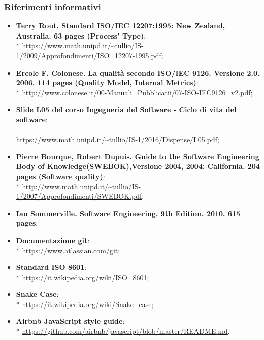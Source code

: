 \subsubsection{Riferimenti informativi}
\begin{itemize}
	\item \textbf{Terry Rout. Standard ISO/IEC 12207:1995: New Zealand, Australia. 63 pages (Process' Type)}:\\* 
	\url{https://www.math.unipd.it/~tullio/IS-1/2009/Approfondimenti/ISO_12207-1995.pdf};
	\item \textbf{Ercole F. Colonese. La qualità secondo ISO/IEC 9126. Versione 2.0. 2006. 114 pages (Quality Model, Internal Metrics)}: \\*
	\url{http://www.colonese.it/00-Manuali_Pubblicatii/07-ISO-IEC9126_v2.pdf};
	\item \textbf{Slide L05 del corso Ingegneria del Software - Ciclo di vita 
	del software}:\\ \\
		\url{https://www.math.unipd.it/~tullio/IS-1/2016/Dispense/L05.pdf};
	\item \textbf{Pierre Bourque, Robert Dupuis. Guide to the Software Engineering Body of Knowledge(SWEBOK),Versione 2004, 2004: California. 204 pages (Software quality)}: \\*
		\url{http://www.math.unipd.it/~tullio/IS-1/2007/Approfondimenti/SWEBOK.pdf};
	\item \textbf{Ian Sommerville. Software Engineering. 9th Edition. 2010. 615 pages};
	\item \textbf{Documentazione git}: \\*
		\url{https://www.atlassian.com/git};
	\item \textbf{Standard ISO 8601}: \\*
		\url{https://it.wikipedia.org/wiki/ISO_8601};
	\item \textbf{Snake Case}\glo: \\*
		\url{https://it.wikipedia.org/wiki/Snake_case};
	\item \textbf{Airbnb JavaScript style guide}: \\*
		\url{https://github.com/airbnb/javascript/blob/master/README.md}.
	
	
	
	
\end{itemize}
